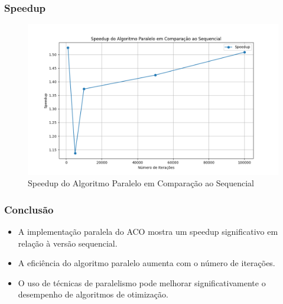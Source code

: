 \documentclass{beamer}
\begin{document}
\begin{frame}
\frametitle{Speedup}
\begin{figure}[H]
    \centering
    \includegraphics[width=0.8\linewidth]{speedup.png}
    \caption{Speedup do Algoritmo Paralelo em Comparação ao Sequencial}
\end{figure}
\end{frame}

\begin{frame}
\frametitle{Conclusão}
\begin{itemize}
    \item A implementação paralela do ACO mostra um speedup significativo em relação à versão sequencial.
    \item A eficiência do algoritmo paralelo aumenta com o número de iterações.
    \item O uso de técnicas de paralelismo pode melhorar significativamente o desempenho de algoritmos de otimização.
\end{itemize}
\end{frame}
\end{document}
